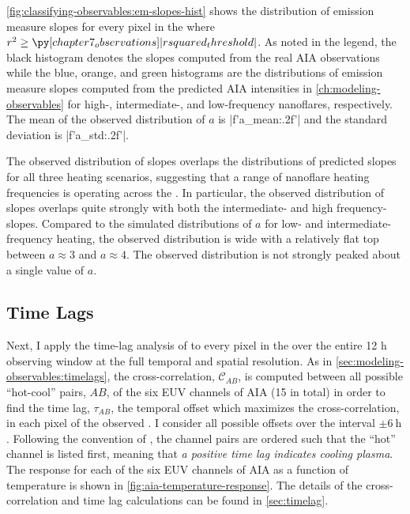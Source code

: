 \autoref{fig:classifying-observables:em-slopes-hist} shows the distribution of emission measure slopes for every pixel in the \AR{} where $r^2\ge\py[chapter7_observations]|rsquared_threshold|$. As noted in the legend, the black histogram denotes the slopes computed from the real AIA observations while the blue, orange, and green histograms are the distributions of emission measure slopes computed from the predicted AIA intensities in \autoref{ch:modeling-observables} for high-, intermediate-, and low-frequency nanoflares, respectively. The mean of the observed distribution of $a$ is |f'{a_mean:.2f}'| and the standard deviation is |f'{a_std:.2f}'|. 

The observed distribution of slopes overlaps the distributions of predicted slopes for all three heating scenarios, suggesting that a range of nanoflare heating frequencies is operating across the \AR. In particular, the observed distribution of slopes overlaps quite strongly with both the intermediate- and high frequency-slopes. Compared to the simulated distributions of $a$ for low- and intermediate-frequency heating, the observed distribution is wide with a relatively flat top between $a\approx3$ and $a\approx4$. The observed distribution is not strongly peaked about a single value of $a$.

\subsection{Time Lags}\label{sec:classifying-observables:timelags}

Next, I apply the time-lag analysis of \citet{viall_evidence_2012} to every pixel in the \AR{} over the entire 12 \si{\hour} observing window at the full temporal and spatial resolution. As in \autoref{sec:modeling-observables:timelags}, the cross-correlation, $\mathcal{C}_{AB}$, is computed between all possible ``hot-cool'' pairs, $AB$, of the six EUV channels of AIA (15 in total) in order to find the time lag, $\tau_{AB}$, the temporal offset which maximizes the cross-correlation, in each pixel of the observed \AR{}. I consider all possible offsets over the interval $\pm\SI{6}{\hour}$. Following the convention of \citet{viall_evidence_2012}, the channel pairs are ordered such that the ``hot'' channel is listed first, meaning that \textit{a positive time lag indicates cooling plasma}. The response for each of the six EUV channels of AIA as a function of temperature is shown in \autoref{fig:aia-temperature-response}. The details of the cross-correlation and time lag calculations can be found in \autoref{sec:timelag}.

